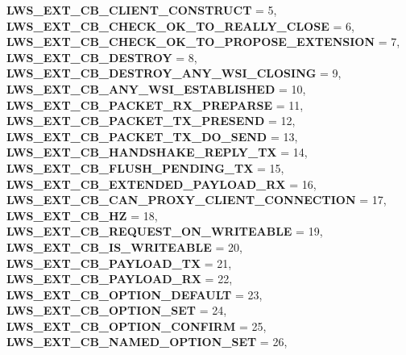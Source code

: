 \begin{DoxyCompactItemize}
{\bfseries L\+W\+S\+\_\+\+E\+X\+T\+\_\+\+C\+B\+\_\+\+C\+L\+I\+E\+N\+T\+\_\+\+C\+O\+N\+S\+T\+R\+U\+CT} = 5, 
{\bfseries L\+W\+S\+\_\+\+E\+X\+T\+\_\+\+C\+B\+\_\+\+C\+H\+E\+C\+K\+\_\+\+O\+K\+\_\+\+T\+O\+\_\+\+R\+E\+A\+L\+L\+Y\+\_\+\+C\+L\+O\+SE} = 6, 
{\bfseries L\+W\+S\+\_\+\+E\+X\+T\+\_\+\+C\+B\+\_\+\+C\+H\+E\+C\+K\+\_\+\+O\+K\+\_\+\+T\+O\+\_\+\+P\+R\+O\+P\+O\+S\+E\+\_\+\+E\+X\+T\+E\+N\+S\+I\+ON} = 7, 
{\bfseries L\+W\+S\+\_\+\+E\+X\+T\+\_\+\+C\+B\+\_\+\+D\+E\+S\+T\+R\+OY} = 8, 
\newline
{\bfseries L\+W\+S\+\_\+\+E\+X\+T\+\_\+\+C\+B\+\_\+\+D\+E\+S\+T\+R\+O\+Y\+\_\+\+A\+N\+Y\+\_\+\+W\+S\+I\+\_\+\+C\+L\+O\+S\+I\+NG} = 9, 
{\bfseries L\+W\+S\+\_\+\+E\+X\+T\+\_\+\+C\+B\+\_\+\+A\+N\+Y\+\_\+\+W\+S\+I\+\_\+\+E\+S\+T\+A\+B\+L\+I\+S\+H\+ED} = 10, 
{\bfseries L\+W\+S\+\_\+\+E\+X\+T\+\_\+\+C\+B\+\_\+\+P\+A\+C\+K\+E\+T\+\_\+\+R\+X\+\_\+\+P\+R\+E\+P\+A\+R\+SE} = 11, 
{\bfseries L\+W\+S\+\_\+\+E\+X\+T\+\_\+\+C\+B\+\_\+\+P\+A\+C\+K\+E\+T\+\_\+\+T\+X\+\_\+\+P\+R\+E\+S\+E\+ND} = 12, 
\newline
{\bfseries L\+W\+S\+\_\+\+E\+X\+T\+\_\+\+C\+B\+\_\+\+P\+A\+C\+K\+E\+T\+\_\+\+T\+X\+\_\+\+D\+O\+\_\+\+S\+E\+ND} = 13, 
{\bfseries L\+W\+S\+\_\+\+E\+X\+T\+\_\+\+C\+B\+\_\+\+H\+A\+N\+D\+S\+H\+A\+K\+E\+\_\+\+R\+E\+P\+L\+Y\+\_\+\+TX} = 14, 
{\bfseries L\+W\+S\+\_\+\+E\+X\+T\+\_\+\+C\+B\+\_\+\+F\+L\+U\+S\+H\+\_\+\+P\+E\+N\+D\+I\+N\+G\+\_\+\+TX} = 15, 
{\bfseries L\+W\+S\+\_\+\+E\+X\+T\+\_\+\+C\+B\+\_\+\+E\+X\+T\+E\+N\+D\+E\+D\+\_\+\+P\+A\+Y\+L\+O\+A\+D\+\_\+\+RX} = 16, 
\newline
{\bfseries L\+W\+S\+\_\+\+E\+X\+T\+\_\+\+C\+B\+\_\+\+C\+A\+N\+\_\+\+P\+R\+O\+X\+Y\+\_\+\+C\+L\+I\+E\+N\+T\+\_\+\+C\+O\+N\+N\+E\+C\+T\+I\+ON} = 17, 
{\bfseries L\+W\+S\+\_\+\+E\+X\+T\+\_\+\+C\+B\+\_\+HZ} = 18, 
{\bfseries L\+W\+S\+\_\+\+E\+X\+T\+\_\+\+C\+B\+\_\+\+R\+E\+Q\+U\+E\+S\+T\+\_\+\+O\+N\+\_\+\+W\+R\+I\+T\+E\+A\+B\+LE} = 19, 
{\bfseries L\+W\+S\+\_\+\+E\+X\+T\+\_\+\+C\+B\+\_\+\+I\+S\+\_\+\+W\+R\+I\+T\+E\+A\+B\+LE} = 20, 
\newline
{\bfseries L\+W\+S\+\_\+\+E\+X\+T\+\_\+\+C\+B\+\_\+\+P\+A\+Y\+L\+O\+A\+D\+\_\+\+TX} = 21, 
{\bfseries L\+W\+S\+\_\+\+E\+X\+T\+\_\+\+C\+B\+\_\+\+P\+A\+Y\+L\+O\+A\+D\+\_\+\+RX} = 22, 
{\bfseries L\+W\+S\+\_\+\+E\+X\+T\+\_\+\+C\+B\+\_\+\+O\+P\+T\+I\+O\+N\+\_\+\+D\+E\+F\+A\+U\+LT} = 23, 
{\bfseries L\+W\+S\+\_\+\+E\+X\+T\+\_\+\+C\+B\+\_\+\+O\+P\+T\+I\+O\+N\+\_\+\+S\+ET} = 24, 
\newline
{\bfseries L\+W\+S\+\_\+\+E\+X\+T\+\_\+\+C\+B\+\_\+\+O\+P\+T\+I\+O\+N\+\_\+\+C\+O\+N\+F\+I\+RM} = 25, 
{\bfseries L\+W\+S\+\_\+\+E\+X\+T\+\_\+\+C\+B\+\_\+\+N\+A\+M\+E\+D\+\_\+\+O\+P\+T\+I\+O\+N\+\_\+\+S\+ET} = 26, 

\end{DoxyCompactItemize}
